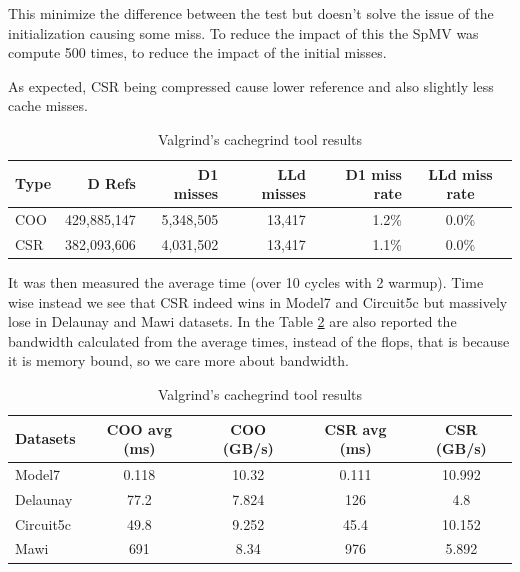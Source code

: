 \documentclass[conference]{IEEEtran}
\begin{document}
This minimize the difference between the test but doesn't solve the issue of the initialization causing some miss. To reduce the impact of this the SpMV was compute 500 times, to reduce the impact of the initial misses.

As expected, CSR being compressed cause lower reference and also slightly less cache misses.
\begin{table}[hbt!]
	\centering
	\begin{adjustbox}{width=\columnwidth}
		\begin{tabular}{lrrrrc}
			\toprule
			\textbf{Type} & \textbf{D Refs} & \textbf{D1 misses} & \textbf{LLd misses} & \textbf{D1 miss rate} & \textbf{LLd miss rate} \\
			\midrule
			COO & 429,885,147 & 5,348,505 & 13,417 & 1.2\% & 0.0\% \\
			CSR & 382,093,606 & 4,031,502 & 13,417 & 1.1\% & 0.0\% \\
			\bottomrule
		\end{tabular}
	\end{adjustbox}
	\vspace{1em}

	\caption{Valgrind's cachegrind tool results}
	\label{tab:cache-results}
\end{table}

It was then measured the average time (over 10 cycles with 2 warmup). Time wise instead we see that CSR indeed wins in Model7 and Circuit5c but massively lose in Delaunay and Mawi datasets. In the Table \ref{tab:time-cpu-results} are also reported the bandwidth calculated from the average times, instead of the flops, that is because it is memory bound, so we care more about bandwidth.

\begin{table}[hbt!]
	\centering
	\begin{adjustbox}{width=\columnwidth}
		\begin{tabular}{lcccc}
			\toprule
			\textbf{Datasets} & \textbf{COO avg (ms)} &\textbf{COO (GB/s)} & \textbf{CSR avg (ms)} & \textbf{CSR (GB/s)}\\
			\midrule
			Model7 & 0.118 & 10.32 & 0.111 & 10.992\\
			Delaunay & 77.2 & 7.824 & 126 & 4.8\\
			Circuit5c & 49.8 & 9.252 & 45.4 & 10.152\\
			Mawi & 691 & 8.34 & 976 & 5.892\\
			\bottomrule
		\end{tabular}
	\end{adjustbox}
	\vspace{1em}

	\caption{Valgrind's cachegrind tool results}
	\label{tab:time-cpu-results}
\end{table}
\end{document}
